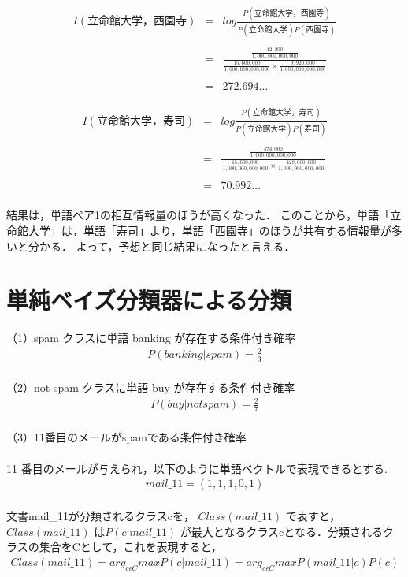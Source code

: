 \documentclass[dvipdfmx,autodetect-engine,titlepage]{jsarticle}
\begin{document}
\begin{eqnarray*}
  I(立命館大学，西園寺) &=& log\frac{P(立命館大学，西園寺)}{P(立命館大学) P(西園寺)} \\\\
  &=& \frac{\frac{42,200}{1,000,000,000,000} }{\frac{15,600,000}{1,000,000,000,000} \times  \frac{9,920,000}{1,000,000,000,000} } \\\\
  &=& 272.694\dots
\end{eqnarray*}

\begin{eqnarray*}
  I(立命館大学，寿司) &=& log\frac{P(立命館大学，寿司)}{P(立命館大学) P(寿司)} \\\\
  &=& \frac{\frac{474,000}{1,000,000,000,000} }{\frac{15,600,000}{1,000,000,000,000} \times  \frac{428,000,000}{1,000,000,000,000} } \\\\
  &=& 70.992\dots \\
\end{eqnarray*}

結果は，単語ペア1の相互情報量のほうが高くなった．
このことから，単語「立命館大学」は，単語「寿司」より，単語「西園寺」のほうが共有する情報量が多いと分かる．
よって，予想と同じ結果になったと言える．

\section{単純ベイズ分類器による分類}
（1）spam クラスに単語 banking が存在する条件付き確率
\begin{eqnarray*}
  P(banking | spam) = \frac{2}{3} \\
\end{eqnarray*}

（2）not spam クラスに単語 buy が存在する条件付き確率
\begin{eqnarray*}
  P(buy | not spam) = \frac{2}{7} \\
\end{eqnarray*}

（3）11番目のメールがspamである条件付き確率\\\\
11 番目のメールが与えられ，以下のように単語ベクトルで表現できるとする. 
\begin{eqnarray*}
  mail\_11 = (1, 1, 1, 0, 1)\\
\end{eqnarray*}


文書mail\_11が分類されるクラスcを，
\begin{math}
  Class(mail\_11)
\end{math}
で表すと，
\begin{math}
  Class(mail\_11)
\end{math}
は\begin{math}
  P(c| mail\_11)
\end{math}
が最大となるクラスcとなる．分類されるクラスの集合をCとして，これを表現すると，
\begin{eqnarray*}
  Class(mail\_11) = arg_{c\epsilon C} maxP(c| mail\_11) = arg_{c\epsilon C} maxP(mail\_11| c) P(c) \\
\end{eqnarray*}
\end{document}
